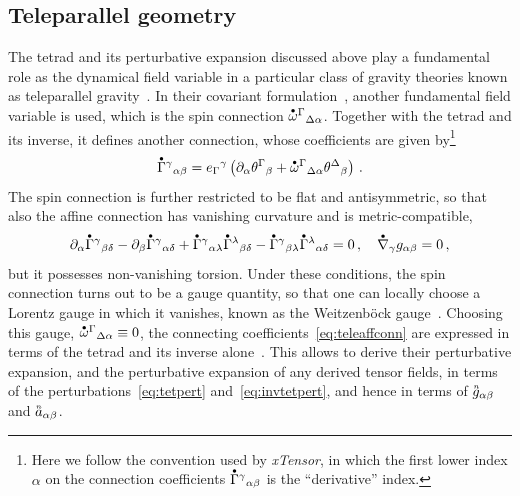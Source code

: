 \documentclass[notitlepage,a4paper,aps,prd,onecolumn,superscriptaddress,nofootinbib,groupedaddress,longbibliography]{revtex4-1}
\newcommand{\order}[2]{\accentset{#2}{#1}}
\newcommand{\tp}[1]{\accentset{\bullet}{#1}}
\newcommand{\xTensor}{\emph{xTensor}}
\begin{document}
\subsection{Teleparallel geometry}\label{ssec:ppntors}
The tetrad and its perturbative expansion discussed above play a fundamental role as the dynamical field variable in a particular class of gravity theories known as teleparallel gravity~\cite{Aldrovandi:2013wha}. In their covariant formulation~\cite{Krssak:2018ywd}, another fundamental field variable is used, which is the spin connection \(\tp{\omega}^{\Gamma}{}_{\Delta\alpha}\). Together with the tetrad and its inverse, it defines another connection, whose coefficients are given by\footnote{Here we follow the convention used by \xTensor, in which the first lower index \(\alpha\) on the connection coefficients \(\tp{\Gamma}^{\gamma}{}_{\alpha\beta}\) is the ``derivative'' index.}
\begin{equation}\label{eq:teleaffconn}
\tp{\Gamma}^{\gamma}{}_{\alpha\beta} = e_{\Gamma}{}^{\gamma}\left(\partial_{\alpha}\theta^{\Gamma}{}_{\beta} + \tp{\omega}^{\Gamma}{}_{\Delta\alpha}\theta^{\Delta}{}_{\beta}\right)\,.
\end{equation}
The spin connection is further restricted to be flat and antisymmetric, so that also the affine connection has vanishing curvature and is metric-compatible,
\begin{equation}
\partial_{\alpha}\tp{\Gamma}^{\gamma}{}_{\beta\delta} - \partial_{\beta}\tp{\Gamma}^{\gamma}{}_{\alpha\delta} + \tp{\Gamma}^{\gamma}{}_{\alpha\lambda}\tp{\Gamma}^{\lambda}{}_{\beta\delta} - \tp{\Gamma}^{\gamma}{}_{\beta\lambda}\tp{\Gamma}^{\lambda}{}_{\alpha\delta} = 0\,, \quad
\tp{\nabla}_{\gamma}g_{\alpha\beta} = 0\,,
\end{equation}
but it possesses non-vanishing torsion. Under these conditions, the spin connection turns out to be a gauge quantity, so that one can locally choose a Lorentz gauge in which it vanishes, known as the Weitzenböck gauge~\cite{Golovnev:2017dox}. Choosing this gauge, \(\tp{\omega}^{\Gamma}{}_{\Delta\alpha} \equiv 0\), the connecting coefficients~\eqref{eq:teleaffconn} are expressed in terms of the tetrad and its inverse alone~\cite{Ualikhanova:2019ygl}. This allows to derive their perturbative expansion, and the perturbative expansion of any derived tensor fields, in terms of the perturbations~\eqref{eq:tetpert} and~\eqref{eq:invtetpert}, and hence in terms of \(\order{g}{n}_{\alpha\beta}\) and \(\order{a}{n}_{\alpha\beta}\).
\end{document}
